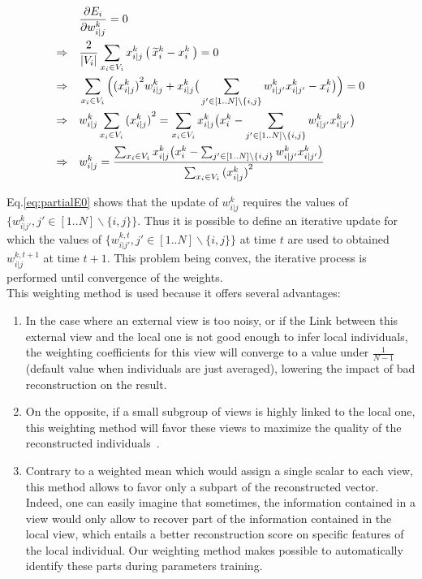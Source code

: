 		\begin{align}
\label{eq:partialE0}
            &\frac{\partial E_i}{\partial w_{i|j}^k} = 0\notag\\
            \Rightarrow\quad &\frac{2}{|V_i|}\sum_{x_i \in V_i} x_{i|j}^k \,
            \big(\,\widetilde{x}_i^k - x_i^k\:\big) = 0\notag\\
            \Rightarrow\quad &\sum_{x_i \in V_i}
            \Big({(x_{i|j}^k)}^2w_{i|j}^k+x_{i|j}^k\big(\sum_{j'\in[1..N]\backslash
            \{i,j\}} w_{i|j'}^k x_{i|j'}^k - x_i^k \big)\Big) = 0\notag\\
            \Rightarrow \quad & w_{i|j}^k \sum_{x_i \in V_i}{(x_{i|j}^k)}^2
            = \sum_{x_i \in V_i} x_{i|j}^k\big(x_i^k -
            \sum_{j'\in[1..N]\backslash \{i,j\}} w_{i|j'}^k x_{i|j'}^k
            \big)\notag\\
            \Rightarrow \quad & w_{i|j}^k = \frac{\sum_{x_i \in V_i}
            x_{i|j}^k\big(x_i^k - \sum_{j'\in[1..N]\backslash \{i,j\}}
            w_{i|j'}^k x_{i|j'}^k \big)}{\sum_{x_i \in V_i}{(x_{i|j}^k)}^2}
		\end{align}
		
Eq.\ref{eq:partialE0} shows that the update of $w_{i|j}^k$ requires the values of $\{w_{i|j'}^k, j'\in[1..N]\backslash \{i,j\}\}$. Thus it is possible to define an iterative update for which the values of $\{w_{i|j'}^{k,t}, j'\in[1..N]\backslash \{i,j\}\}$ at time $t$ are used to obtained $w_{i|j}^{k,t+1}$ at time $t+1$. This problem being convex, the iterative process is performed until convergence of the weights.\\
		
This weighting method is used because it offers several advantages:
		\begin{enumerate}
            \item In the case where an external view is too noisy, or if the Link between this external view and the local one is not good enough to infer local individuals, the weighting coefficients for this view will converge to a value under $\frac{1}{N-1}$ (default value when individuals are just averaged), lowering the impact of bad reconstruction on the result.
    \item On the opposite, if a small subgroup of views is highly linked to the local one, this weighting method will favor these views to maximize the quality of the reconstructed individuals~\cite{sublime2017analysis,sublime2018analysis}.
    \item Contrary to a weighted mean which would assign a single scalar to each view, this method allows to favor only a subpart of the reconstructed vector. Indeed, one can easily imagine that sometimes, the information contained in a view would only allow to recover part of the information contained in the local view, which entails a better reconstruction score on specific features of the local individual. Our weighting method makes possible to automatically identify these parts during parameters training.
		\end{enumerate}
		
